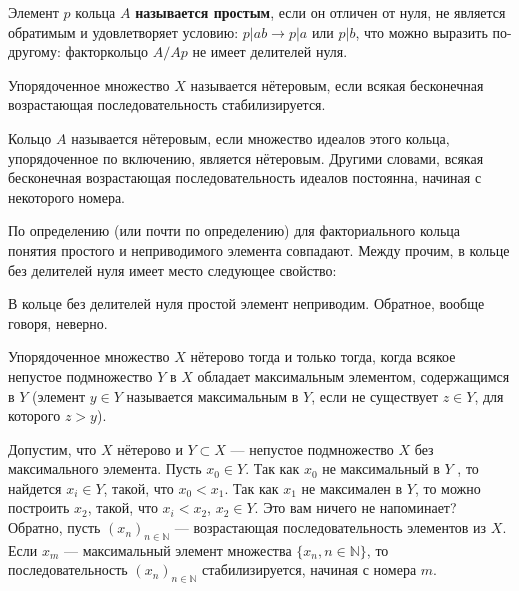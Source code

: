 \begin{determ}
\textit{\indent} Элемент $p$ кольца $A$ \textbf{называется простым}, если он отличен от нуля, не является обратимым и удовлетворяет условию: $p | ab \rightarrow p | a$ или $p | b$, что можно выразить по-другому: факторкольцо $A/Ap$ не имеет делителей нуля.
\end{determ}

\begin{determ}
\textit{\indent} Упорядоченное множество $X$ называется нётеровым, если всякая бесконечная возрастающая последовательность стабилизируется.
\end{determ}

\newpage
\begin{determ}
\textit{\indent} Кольцо $A$ называется нётеровым, если множество идеалов этого кольца, упорядоченное по включению, является нётеровым. Другими словами, всякая бесконечная возрастающая последовательность идеалов постоянна, начиная с некоторого номера.
\end{determ}

По определению (или почти по определению) для факториального кольца понятия простого и неприводимого элемента совпадают. Между прочим, в кольце без делителей нуля имеет место следующее свойство:

\begin{determ}
\textit{\indent} В кольце без делителей нуля простой элемент неприводим. Обратное, вообще говоря, неверно.
\end{determ}

\begin{determ}
\textit{\indent} Упорядоченное множество $X$ нётерово тогда и только тогда, когда всякое непустое подмножество $Y$ в $X$ обладает максимальным элементом, содержащимся в $Y$ (элемент $y \in Y$ называется максимальным в $Y$, если не существует $z \in Y$, для которого $z > y$).
\end{determ}

\begin{myproof}
Допустим, что $X$ нётерово и $Y \subset X$ — непустое подмножество $X$ без максимального элемента. Пусть $x_0 \in Y$. Так как $x_0$ не максимальный в $Y$ , то найдется $x_i \in Y$, такой, что $x_0 < x_1$. Так как $x_1$ не максимален в $Y$, то можно построить $x_2$, такой, что $x_i < x_2$, $x_2 \in Y$. Это вам ничего не напоминает? \newline Обратно, пусть $(x_n)_{n \in \mathds{N}}$ — возрастающая последовательность элементов из $X$. Если $x_m$ — максимальный элемент множества $\{x_n,n \in \mathds{N}\}$, то последовательность $(x_n)_{n \in \mathds{N}}$ стабилизируется, начиная с номера $m$.\\
\end{myproof}


